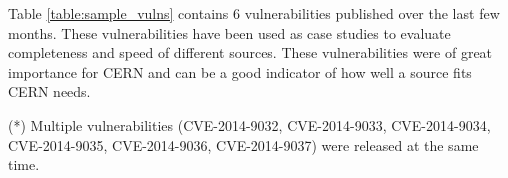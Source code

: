 Table \ref{table:sample_vulns} contains 6 vulnerabilities published over the last few months. These vulnerabilities have been used as case studies to evaluate completeness and speed of different sources. These vulnerabilities were of great importance for CERN and can be a good indicator of how well a source fits CERN needs.
\begin{table}
\begin{center}
    \caption{Sample vulnerabilities}
    \label{table:sample_vulns}
     \footnotesize{(*) Multiple vulnerabilities (CVE-2014-9032, CVE-2014-9033, CVE-2014-9034, CVE-2014-9035, CVE-2014-9036, CVE-2014-9037) were released at the same time.}
   \end{center}
   
\end{table}


